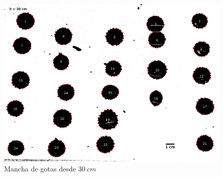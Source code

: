 \begin{figure}[H] \centering
\includegraphics[width=0.66\linewidth]{src/30-1.png} \caption{Mancha de gotas
desde $30\ cm$} \label{fig:30cm-1} \end{figure}

